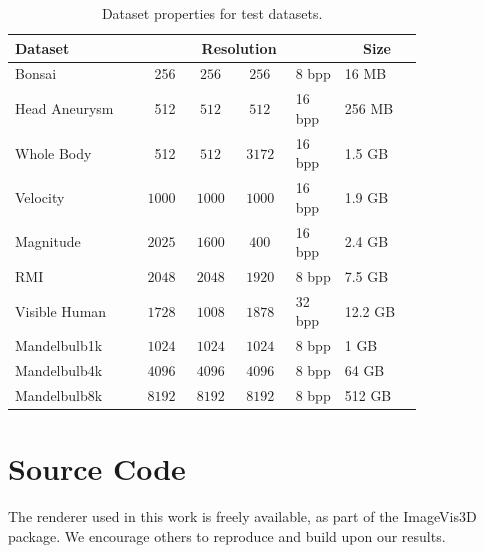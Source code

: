 \begin{table}
  \centering
  \caption{Dataset properties for test datasets.}
  \label{tbl:sizes}
  \begin{tabular*}{\linewidth}{|p{0.27\linewidth}|p{0.091\linewidth}@{$\times$}p{0.091\linewidth}@{$\times$}p{0.091\linewidth}p{0.105\linewidth}@{\quad}|p{0.16175\linewidth}|}\hline
    \multicolumn{1}{|l|}{\textbf{Dataset}} &
    \multicolumn{4}{c|}{\textbf{Resolution}} &
    \multicolumn{1}{c|}{\textbf{Size}}\\\hline
    Bonsai        & ~256 &$~256$ &$~256$ & 8 bpp  & 16 MB\\
    Head Aneurysm & ~512 &$~512$ &$~512$ & 16 bpp & 256 MB\\
    Whole Body    & ~512 &$~512$ &$3172$ & 16 bpp & 1.5 GB\\
    Velocity      & $1000$ &$1000$ &$1000$ & 16 bpp & 1.9 GB\\
    Magnitude     & $2025$ &$1600$ &$~400$ & 16 bpp & 2.4 GB\\
    RMI           & $2048$ &$2048$ &$1920$ & 8 bpp  & 7.5 GB\\
    Visible Human & $1728$ &$1008$ &$1878$ & 32 bpp & 12.2 GB\\
    Mandelbulb1k  & $1024$ &$1024$ &$1024$ & 8 bpp  & 1 GB\\
    Mandelbulb4k  & $4096$ &$4096$ &$4096$ & 8 bpp  & 64 GB\\
    Mandelbulb8k  & $8192$ &$8192$ &$8192$ & 8 bpp  & 512 GB\\\hline
  \end{tabular*}
\end{table}

\section{Source Code}

The renderer used in this work is freely available, as part of the
ImageVis3D~\cite{Fogal:2010:Tuvok} package.  We encourage others to
reproduce and build upon our results.
